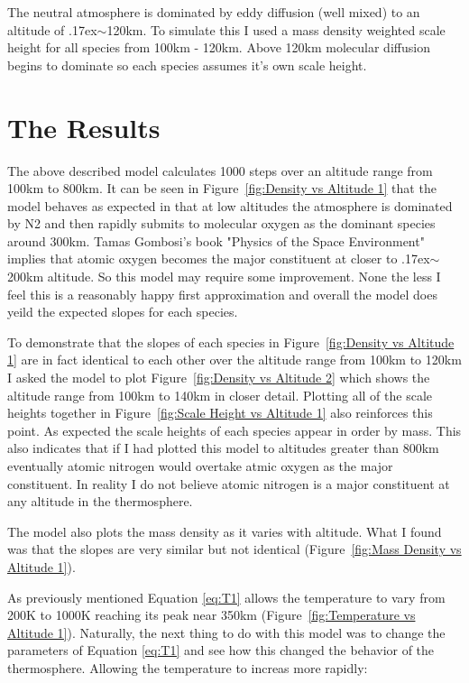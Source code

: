 \documentclass[12pt,letterpaper]{article}
\begin{document}
The neutral atmosphere is dominated by eddy diffusion (well mixed) to an altitude of \raise.17ex\hbox{$\scriptstyle\sim$}120km. To simulate this I used a mass density weighted scale height for all species from 100km - 120km. Above 120km molecular diffusion begins to dominate so each species assumes it's own scale height.

\section{The Results}

The above described model calculates 1000 steps over an altitude range from 100km to 800km. It can be seen in Figure~\ref{fig:Density vs Altitude 1} that the model behaves as expected in that at low altitudes the atmosphere is dominated by N2 and then rapidly submits to molecular oxygen as the dominant species around 300km. Tamas Gombosi's book "Physics of the Space Environment" implies that atomic oxygen becomes the major constituent at closer to \raise.17ex\hbox{$\scriptstyle\sim$}200km altitude. So this model may require some improvement. None the less I feel this is a reasonably happy first approximation and overall the model does yeild the expected slopes for each species.

To demonstrate that the slopes of each species in Figure~\ref{fig:Density vs Altitude 1} are in fact identical to each other over the altitude range from 100km to 120km I asked the model to plot Figure~\ref{fig:Density vs Altitude 2} which shows the altitude range from 100km to 140km in closer detail. Plotting all of the scale heights together in Figure~\ref{fig:Scale Height vs Altitude 1} also reinforces this point. As expected the scale heights of each species appear in order by mass. This also indicates that if I had plotted this model to altitudes greater than 800km eventually atomic nitrogen would overtake atmic oxygen as the major constituent. In reality I do not believe atomic nitrogen is a major constituent at any altitude in the thermosphere.

The model also plots the mass density as it varies with altitude. What I found was that the slopes are very similar but not identical (Figure~\ref{fig:Mass Density vs Altitude 1}).  

As previously mentioned Equation \eqref{eq:T1} allows the temperature to vary from 200K to 1000K reaching its peak near 350km (Figure~\ref{fig:Temperature vs Altitude 1}). Naturally, the next thing to do with this model was to change the parameters of Equation \eqref{eq:T1} and see how this changed the behavior of the thermosphere. Allowing the temperature to increas more rapidly:
\end{document}

